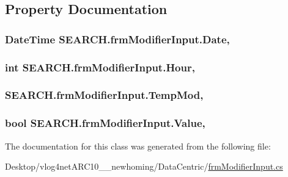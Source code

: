 \subsection{Property Documentation}
\hypertarget{class_s_e_a_r_c_h_1_1frm_modifier_input_aae4ea1b800112742944b3338fedccfd1}{
\subsubsection[{Date}]{\setlength{\rightskip}{0pt plus 5cm}Date\-Time S\-E\-A\-R\-C\-H.\-frm\-Modifier\-Input.\-Date\hspace{0.3cm}{\ttfamily [get]}, {\ttfamily [set]}}}\label{class_s_e_a_r_c_h_1_1frm_modifier_input_aae4ea1b800112742944b3338fedccfd1}
\hypertarget{class_s_e_a_r_c_h_1_1frm_modifier_input_a1696be177f3cecbecf28f7e2743267d6}{
\subsubsection[{Hour}]{\setlength{\rightskip}{0pt plus 5cm}int S\-E\-A\-R\-C\-H.\-frm\-Modifier\-Input.\-Hour\hspace{0.3cm}{\ttfamily [get]}, {\ttfamily [set]}}}\label{class_s_e_a_r_c_h_1_1frm_modifier_input_a1696be177f3cecbecf28f7e2743267d6}
\hypertarget{class_s_e_a_r_c_h_1_1frm_modifier_input_a9d8f7d817e0833d328014551f737632f}{
\subsubsection[{Temp\-Mod}]{ S\-E\-A\-R\-C\-H.\-frm\-Modifier\-Input.\-Temp\-Mod\hspace{0.3cm}{\ttfamily [get]}, {\ttfamily [set]}}}\label{class_s_e_a_r_c_h_1_1frm_modifier_input_a9d8f7d817e0833d328014551f737632f}
\hypertarget{class_s_e_a_r_c_h_1_1frm_modifier_input_ad264b10459496052416016d7ef96639f}{
\subsubsection[{Value}]{\setlength{\rightskip}{0pt plus 5cm}bool S\-E\-A\-R\-C\-H.\-frm\-Modifier\-Input.\-Value\hspace{0.3cm}{\ttfamily [get]}, {\ttfamily [set]}}}\label{class_s_e_a_r_c_h_1_1frm_modifier_input_ad264b10459496052416016d7ef96639f}


The documentation for this class was generated from the following file\-:\begin{DoxyCompactItemize}
\item 
Desktop/vlog4net\-A\-R\-C10\-\_\-\_\-newhoming/\-Data\-Centric/\hyperlink{frm_modifier_input_8cs}{frm\-Modifier\-Input.\-cs}\end{DoxyCompactItemize}

